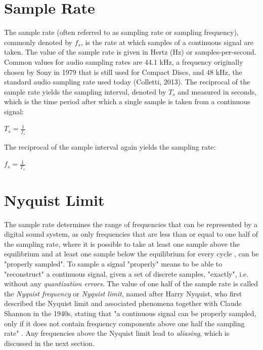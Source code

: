 \documentclass[12pt,twoside]{report}
\begin{document}
\section{Sample Rate}

The sample rate (often referred to as sampling rate or sampling frequency), commonly denoted by $f_{s}$, is the rate at which samples of a continuous signal are taken. The value of the sample rate is given in Hertz (Hz) or samples-per-second. Common values for audio sampling rates are 44.1 kHz, a frequency originally chosen by Sony in 1979 that is still used for Compact Discs, and 48 kHz, the standard audio sampling rate used today  (Colletti, 2013). The reciprocal of the sample rate yields the sampling interval, denoted by $T_{s}$ and measured in seconds, which is the time period after which a single sample is taken from a continuous signal:\begin{center} $T_{s} = \frac{1}{f_{s}}$ \end{center} The reciprocal of the sample interval again yields the sampling rate: \begin{center} $f_{s} = \frac{1}{T_{s}}$ \end{center}

\section{Nyquist Limit}

The sample rate determines the range of frequencies that can be represented by a digital sound system, as only frequencies that are less than or equal to one half of the sampling rate, where it is possible to take at least one sample above the equilibrium and at least one sample below the equilibrium for every cycle , can be "properly sampled". To sample a signal "properly" means to be able to "reconstruct" a continuous signal, given a set of discrete samples, "exactly", i.e. without any \emph{quantization errors}. The value of one half of the sample rate is called the \emph{Nyquist frequency} or \emph{Nyquist limit}, named after Harry Nyquist, who first described the Nyquist limit and associated phenomena together with Claude Shannon in the 1940s, stating that "a continuous signal can be properly sampled, only if it does not contain frequency components above one half the sampling rate" . Any frequencies above the Nyquist limit lead to \emph{aliasing}, which is discussed in the next section.\\
\end{document}
